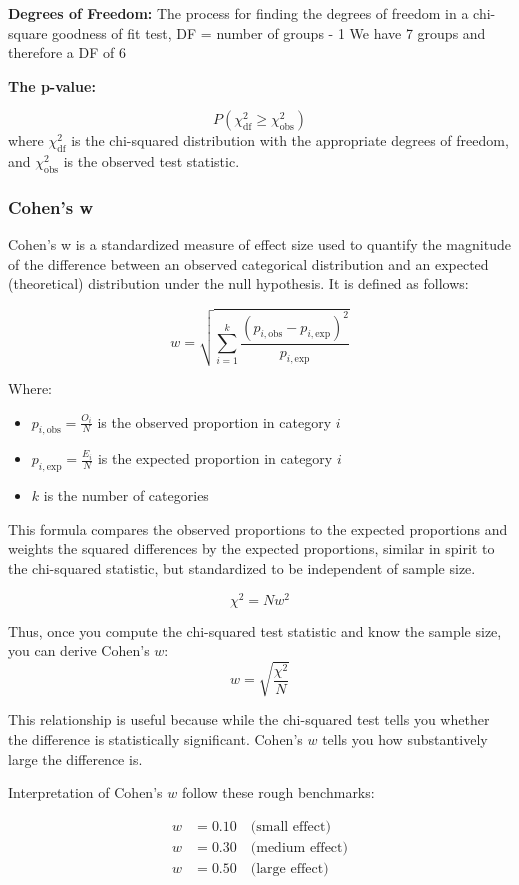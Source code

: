 \documentclass{article}
\begin{document}
\textbf{Degrees of Freedom:}
The process for finding the degrees of freedom in a chi-square goodness of fit test, DF = number of groups - 1
We have 7 groups and therefore a DF of 6 

\textbf{The p-value:}

\[
P\left( \chi^2_{\text{df}} \geq \chi^2_{\text{obs}} \right)
\]
where \( \chi^2_{\text{df}} \) is the chi-squared distribution with the appropriate degrees of freedom, and \( \chi^2_{\text{obs}} \) is the observed test statistic.

\subsubsection{Cohen's w}
Cohen’s w is a standardized measure of effect size used to quantify the magnitude of the difference between an observed categorical distribution and an expected (theoretical) distribution under the null hypothesis.
It is defined as follows:

\[
w = \sqrt{ \sum_{i=1}^{k} \frac{(p_{i,\text{obs}} - p_{i,\text{exp}})^2}{p_{i,\text{exp}}} }
\]

Where:
\begin{itemize}
  \item \( p_{i,\text{obs}} = \frac{O_i}{N} \) is the observed proportion in category \( i \)
  \item \( p_{i,\text{exp}} = \frac{E_i}{N} \) is the expected proportion in category \( i \)
  \item \( k \) is the number of categories
\end{itemize}

This formula compares the observed proportions to the expected proportions and weights the squared differences by the expected proportions, similar in spirit to the chi-squared statistic, but standardized to be independent of sample size. 

\[
\chi^2 = {N}{w^2}
\]

Thus, once you compute the chi-squared test statistic and know the sample size, you can derive Cohen's \({w}\):
\[
w = \sqrt{ \frac{\chi^2}{N} }
\]

This relationship is useful because while the chi-squared test tells you whether the difference is statistically significant. Cohen's \(w\) tells you how substantively large the difference is.  

Interpretation of Cohen's \(w\) follow these rough benchmarks:

\begin{align*}
w &= 0.10 \quad \text{(small effect)} \\
w &= 0.30 \quad \text{(medium effect)} \\
w &= 0.50 \quad \text{(large effect)}
\end{align*}
\end{document}
